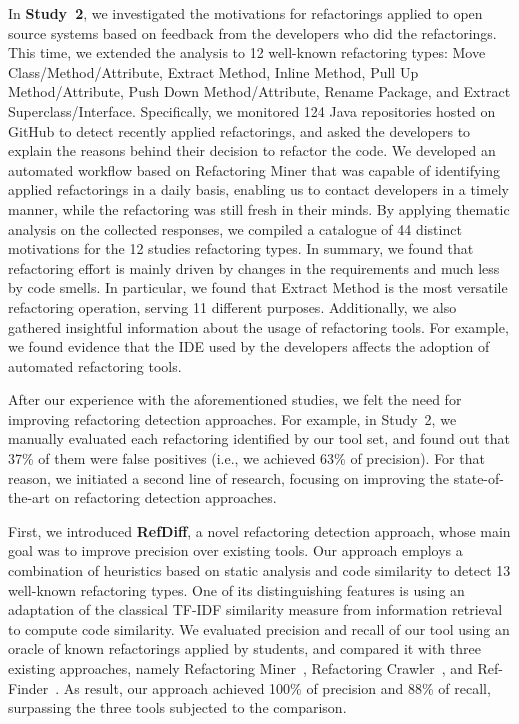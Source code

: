 In \textbf{Study~2}, we investigated the motivations for refactorings applied to open source systems based on feedback from the developers who did the refactorings.
This time, we extended the analysis to 12 well-known refactoring types: Move Class/Method/Attribute, Extract Method, Inline Method, Pull Up Method/Attribute, Push Down Method/Attribute, Rename Package, and Extract Superclass/Interface.
Specifically, we monitored 124 Java repositories hosted on GitHub to detect recently applied refactorings, and asked the developers to explain the reasons behind their decision to refactor the code.
We developed an automated workflow based on Refactoring Miner that was capable of identifying applied refactorings in a daily basis, enabling us to contact developers in a timely manner, while the refactoring was still fresh in their minds.
By applying thematic analysis on the collected responses, we compiled a catalogue of 44 distinct motivations for the 12 studies refactoring types.
In summary, we found that refactoring effort is mainly driven by changes in the requirements and much less by code smells.
In particular, we found that Extract Method is the most versatile refactoring operation, serving 11 different purposes.
Additionally, we also gathered insightful information about the usage of refactoring tools. For example, we found evidence that the IDE used by the developers affects the adoption of automated refactoring tools.


After our experience with the aforementioned studies, we felt the need for improving refactoring detection approaches.
For example, in Study~2, we manually evaluated each refactoring identified by our tool set, and found out that 37\% of them were false positives (i.e., we achieved 63\% of precision).
For that reason, we initiated a second line of research, focusing on improving the state-of-the-art on refactoring detection approaches.

First, we introduced \textbf{RefDiff}, a novel refactoring detection approach, whose main goal was to improve precision over existing tools.
Our approach employs a combination of heuristics based on static analysis and code
similarity to detect 13 well-known refactoring types.
One of its distinguishing features is using an adaptation of the classical TF-IDF similarity measure from information retrieval to compute code similarity.
We evaluated precision and recall of our tool using an oracle of known refactorings applied by students, and compared it with three existing approaches, namely Refactoring Miner~\citep{tsantalis_empiricalstudy}, Refactoring Crawler~\citep{dig2006automated}, and Ref-Finder~\citep{Kim:2010:RefFinder}.
As result, our approach achieved 100\% of precision and 88\% of recall, surpassing the three tools subjected to the comparison.

